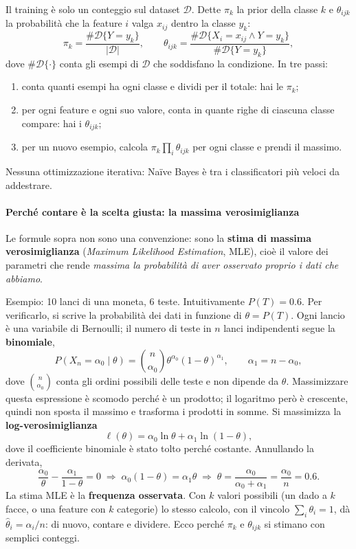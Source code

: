 \documentclass[12pt]{extarticle}
\begin{document}
\noindent Il training è solo un conteggio sul dataset $\mathcal{D}$. Dette $\pi_k$ la prior della classe $k$ e $\theta_{ijk}$ la probabilità che la feature $i$ valga $x_{ij}$ dentro la classe $y_k$:
\[
\pi_k = \frac{\#\mathcal{D}\{Y=y_k\}}{|\mathcal{D}|},
\qquad
\theta_{ijk} = \frac{\#\mathcal{D}\{X_i=x_{ij}\land Y=y_k\}}{\#\mathcal{D}\{Y=y_k\}},
\]
dove $\#\mathcal{D}\{\cdot\}$ conta gli esempi di $\mathcal{D}$ che soddisfano la condizione. In tre passi:
\begin{enumerate}
    \item conta quanti esempi ha ogni classe e dividi per il totale: hai le $\pi_k$;
    \item per ogni feature e ogni suo valore, conta in quante righe di ciascuna classe compare: hai i $\theta_{ijk}$;
    \item per un nuovo esempio, calcola $\pi_k\prod_i\theta_{ijk}$ per ogni classe e prendi il massimo.
\end{enumerate}
Nessuna ottimizzazione iterativa: Naïve Bayes è tra i classificatori più veloci da addestrare.

\paragraph{Perché contare è la scelta giusta: la massima verosimiglianza}
Le formule sopra non sono una convenzione: sono la \textbf{stima di massima verosimiglianza} (\textit{Maximum Likelihood Estimation}, MLE), cioè il valore dei parametri che rende \emph{massima la probabilità di aver osservato proprio i dati che abbiamo}.

\noindent Esempio: 10 lanci di una moneta, 6 teste. Intuitivamente $P(T)=0.6$. Per verificarlo, si scrive la probabilità dei dati in funzione di $\theta=P(T)$. Ogni lancio è una variabile di Bernoulli; il numero di teste in $n$ lanci indipendenti segue la \textbf{binomiale},
\[
P(X_n=\alpha_0\mid\theta)=\binom{n}{\alpha_0}\theta^{\alpha_0}(1-\theta)^{\alpha_1},
\qquad \alpha_1=n-\alpha_0,
\]
dove $\binom{n}{\alpha_0}$ conta gli ordini possibili delle teste e non dipende da $\theta$. Massimizzare questa espressione è scomodo perché è un prodotto; il logaritmo però è crescente, quindi non sposta il massimo e trasforma i prodotti in somme. Si massimizza la \textbf{log-verosimiglianza}
\[
\ell(\theta) = \alpha_0\ln\theta + \alpha_1\ln(1-\theta),
\]
dove il coefficiente binomiale è stato tolto perché costante. Annullando la derivata,
\[
\frac{\alpha_0}{\theta} - \frac{\alpha_1}{1-\theta} = 0
\;\Longrightarrow\;
\alpha_0(1-\theta)=\alpha_1\theta
\;\Longrightarrow\;
\hat\theta = \frac{\alpha_0}{\alpha_0+\alpha_1} = \frac{\alpha_0}{n} = 0.6 .
\]
La stima MLE è la \textbf{frequenza osservata}. Con $k$ valori possibili (un dado a $k$ facce, o una feature con $k$ categorie) lo stesso calcolo, con il vincolo $\sum_i\theta_i=1$, dà $\hat\theta_i=\alpha_i/n$: di nuovo, contare e dividere. Ecco perché $\pi_k$ e $\theta_{ijk}$ si stimano con semplici conteggi.
\end{document}
